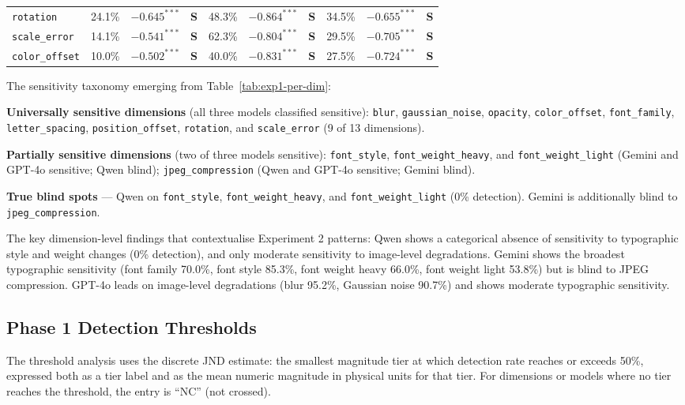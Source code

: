 \begin{table}[htbp]
{\begin{tabular}{l ccc ccc ccc}
\texttt{rotation}          & 24.1\% & $-0.645^{***}$ & \textbf{S} & 48.3\% & $-0.864^{***}$ & \textbf{S} & 34.5\% & $-0.655^{***}$ & \textbf{S} \\
\texttt{scale\_error}      & 14.1\% & $-0.541^{***}$ & \textbf{S} & 62.3\% & $-0.804^{***}$ & \textbf{S} & 29.5\% & $-0.705^{***}$ & \textbf{S} \\
\texttt{color\_offset}     & 10.0\% & $-0.502^{***}$ & \textbf{S} & 40.0\% & $-0.831^{***}$ & \textbf{S} & 27.5\% & $-0.724^{***}$ & \textbf{S} \\
\bottomrule
\end{tabular}%
}
\end{table}

The sensitivity taxonomy emerging from Table~\ref{tab:exp1-per-dim}:

\textbf{Universally sensitive dimensions} (all three models classified sensitive): \texttt{blur}, \texttt{gaussian\_noise}, \texttt{opacity}, \texttt{color\_offset}, \texttt{font\_family}, \texttt{letter\_spacing}, \texttt{position\_offset}, \texttt{rotation}, and \texttt{scale\_error} (9 of 13 dimensions).

\textbf{Partially sensitive dimensions} (two of three models sensitive): \texttt{font\_style}, \texttt{font\_weight\_heavy}, and \texttt{font\_weight\_light} (Gemini and GPT-4o sensitive; Qwen blind); \texttt{jpeg\_compression} (Qwen and GPT-4o sensitive; Gemini blind).

\textbf{True blind spots} --- Qwen on \texttt{font\_style}, \texttt{font\_weight\_heavy}, and \texttt{font\_weight\_light} (0\% detection). Gemini is additionally blind to \texttt{jpeg\_compression}.

The key dimension-level findings that contextualise Experiment 2 patterns: Qwen shows a categorical absence of sensitivity to typographic style and weight changes (0\% detection), and only moderate sensitivity to image-level degradations. Gemini shows the broadest typographic sensitivity (font family 70.0\%, font style 85.3\%, font weight heavy 66.0\%, font weight light 53.8\%) but is blind to JPEG compression. GPT-4o leads on image-level degradations (blur 95.2\%, Gaussian noise 90.7\%) and shows moderate typographic sensitivity.

\subsection{Phase 1 Detection Thresholds} \label{sec:phase1-thresholds}

The threshold analysis uses the discrete JND estimate: the smallest magnitude tier at which detection rate reaches or exceeds 50\%, expressed both as a tier label and as the mean numeric magnitude in physical units for that tier. For dimensions or models where no tier reaches the threshold, the entry is ``NC'' (not crossed).

